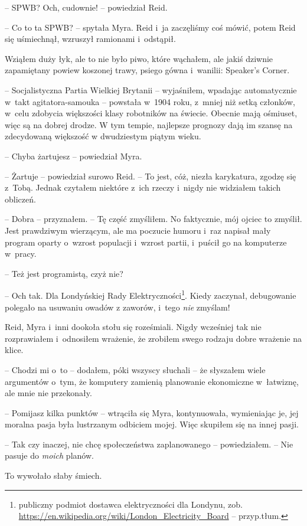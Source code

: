 \documentclass[oneside,polish,11pt,sfheadings]{mwbk}
\begin{document}
-- SPWB? Och, cudownie! -- powiedział Reid.

-- Co to ta SPWB? -- spytała Myra. Reid i~ja zaczęliśmy coś mówić, potem
Reid się uśmiechnął, wzruszył ramionami i~odstąpił.

Wziąłem duży łyk, ale to nie było piwo, które wąchałem, ale jakiś
dziwnie zapamiętany powiew koszonej trawy, psiego gówna i~wanilii:
Speaker's Corner. 

-- Socjalistyczna Partia Wielkiej Brytanii -- wyjaśniłem, wpadając automatycznie w~takt agitatora-samouka -- powstała w~1904 roku, z~mniej niż setką członków, w~celu zdobycia większości klasy
robotników na świecie. Obecnie mają ośmiuset, więc są na dobrej drodze.
W tym tempie, najlepsze prognozy dają im szansę na zdecydowaną większość
w dwudziestym piątym wieku.

-- Chyba żartujesz -- powiedział Myra.

-- Żartuje -- powiedział surowo Reid. -- To jest, cóż, niezła karykatura,
zgodzę się z~Tobą. Jednak czytałem niektóre z~ich rzeczy i~nigdy nie
widziałem takich obliczeń.

-- Dobra -- przyznałem. -- Tę część zmyśliłem. No faktycznie, mój ojciec to
zmyślił. Jest prawdziwym wierzącym, ale ma poczucie humoru i~raz napisał
mały program oparty o~wzrost populacji i~wzrost partii, i~puścił go na
komputerze w~pracy.

-- Też jest programistą, czyż nie?

-- Och tak. Dla Londyńskiej Rady Elektryczności\footnote{publiczny podmiot
dostawca elektryczności dla Londynu,
zob. \url{https://en.wikipedia.org/wiki/London_Electricity_Board} -- przyp.tłum.}. Kiedy zaczynał, debugowanie polegało na usuwaniu owadów
z zaworów, i~tego \emph{nie} zmyślam!

Reid, Myra i~inni dookoła stołu się roześmiali. Nigdy wcześniej tak nie
rozprawiałem i~odnosiłem wrażenie, że zrobiłem swego rodzaju dobre
wrażenie na klice.

-- Chodzi mi o~to -- dodałem, póki wszyscy słuchali -- że słyszałem wiele
argumentów o~tym, że komputery zamienią planowanie ekonomiczne w~łatwiznę, ale mnie nie przekonały.

-- Pomijasz kilka punktów -- wtrąciła się Myra, kontynuowała, wymieniając
je, jej moralna pasja była lustrzanym odbiciem mojej. Więc skupiłem się
na innej pasji.

-- Tak czy inaczej, nie chcę społeczeństwa zaplanowanego -- powiedziałem.
-- Nie pasuje do \emph{moich} planów.

To wywołało słaby śmiech.
\end{document}
